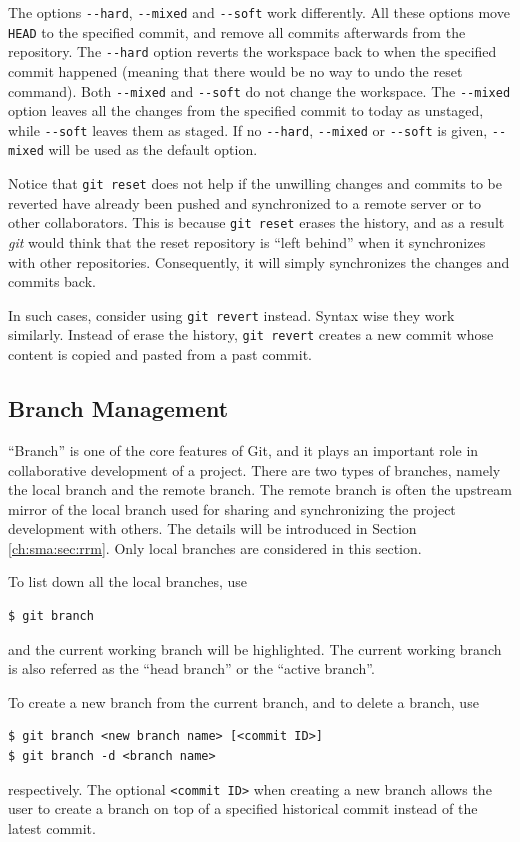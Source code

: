 The options \verb|--hard|, \verb|--mixed| and \verb|--soft| work differently. All these options move \verb|HEAD| to the specified commit, and remove all commits afterwards from the repository. The \verb|--hard| option reverts the workspace back to when the specified commit happened (meaning that there would be no way to undo the reset command). Both \verb|--mixed| and \verb|--soft| do not change the workspace. The \verb|--mixed| option leaves all the changes from the specified commit to today as unstaged, while \verb|--soft| leaves them as staged. If no \verb|--hard|, \verb|--mixed| or \verb|--soft| is given, \verb|--mixed| will be used as the default option.

Notice that \verb|git reset| does not help if the unwilling changes and commits to be reverted have already been pushed and synchronized to a remote server or to other collaborators. This is because \verb|git reset| erases the history, and as a result \textit{git} would think that the reset repository is ``left behind'' when it synchronizes with other repositories. Consequently, it will simply synchronizes the changes and commits back.

In such cases, consider using \verb|git revert| instead. Syntax wise they work similarly. Instead of erase the history, \verb|git revert| creates a new commit whose content is copied and pasted from a past commit.

\subsection{Branch Management}

``Branch'' is one of the core features of Git, and it plays an important role in collaborative development of a project. There are two types of branches, namely the local branch and the remote branch. The remote branch is often the upstream mirror of the local branch used for sharing and synchronizing the project development with others. The details will be introduced in Section \ref{ch:sma:sec:rrm}. Only local branches are considered in this section.

To list down all the local branches, use
\begin{lstlisting}
$ git branch
\end{lstlisting}
and the current working branch will be highlighted. The current working branch is also referred as the ``head branch'' or the ``active branch''.

To create a new branch from the current branch, and to delete a branch, use
\begin{lstlisting}
$ git branch <new branch name> [<commit ID>]
$ git branch -d <branch name>
\end{lstlisting}
respectively. The optional \verb|<commit ID>| when creating a new branch allows the user to create a branch on top of a specified historical commit instead of the latest commit.

